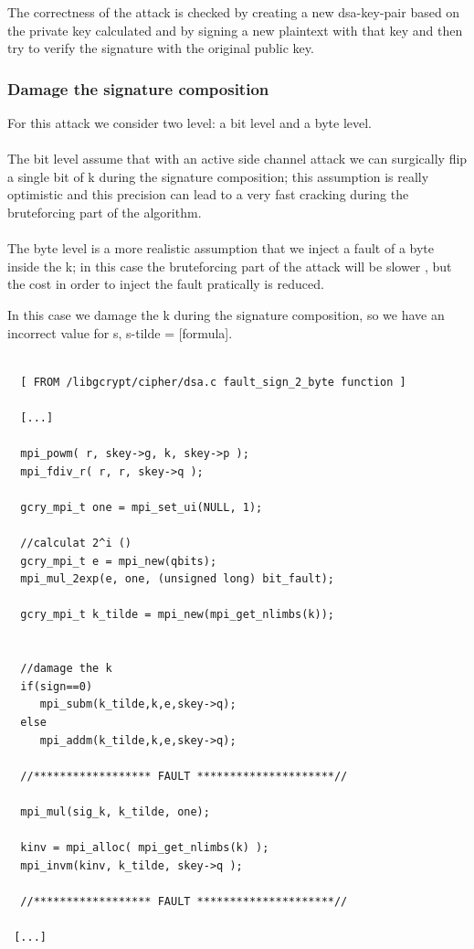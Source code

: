 \documentclass[11pt,english]{article}
\begin{document}
The correctness of the attack is checked by creating a new dsa-key-pair based on the private key calculated and by signing a new plaintext with that key and then try to verify the signature with the original public key.


\subsubsection{Damage the signature composition}

For this attack we consider two level: a bit level and a byte level.\\\\ The bit level assume that with an active side channel attack we can surgically flip a single bit of k during the signature composition; this assumption is really optimistic and this precision can lead to a very fast cracking during the bruteforcing part of the algorithm.\\\\ The byte level is a more realistic assumption that we inject a fault of a byte inside the k; in this case the bruteforcing part of the attack will be slower , but the cost in order to inject the fault pratically is reduced.

In this case we damage the k during the signature composition, so we have an incorrect value for s, s-tilde = [formula].

\begin{lstlisting}
 
  [ FROM /libgcrypt/cipher/dsa.c fault_sign_2_byte function ]

  [...]
  
  mpi_powm( r, skey->g, k, skey->p );
  mpi_fdiv_r( r, r, skey->q );

  gcry_mpi_t one = mpi_set_ui(NULL, 1); 

  //calculat 2^i ()
  gcry_mpi_t e = mpi_new(qbits);
  mpi_mul_2exp(e, one, (unsigned long) bit_fault);  

  gcry_mpi_t k_tilde = mpi_new(mpi_get_nlimbs(k));
  

  //damage the k
  if(sign==0)
     mpi_subm(k_tilde,k,e,skey->q);  
  else
     mpi_addm(k_tilde,k,e,skey->q);

  //****************** FAULT *********************//
  
  mpi_mul(sig_k, k_tilde, one);
  
  kinv = mpi_alloc( mpi_get_nlimbs(k) );
  mpi_invm(kinv, k_tilde, skey->q );
  
  //****************** FAULT *********************//
  
 [...]

\end{lstlisting}
\end{document}
